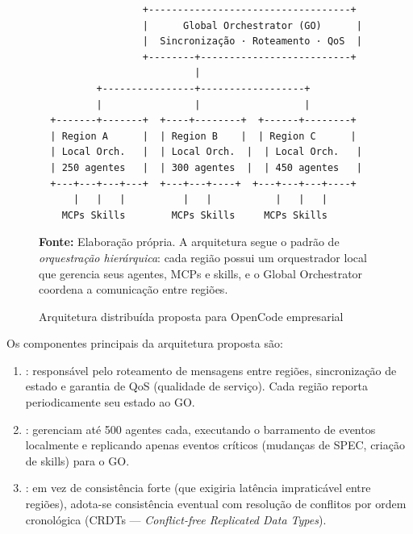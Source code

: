 \begin{figure}[htb]
\centering
\caption{Arquitetura distribuída proposta para OpenCode empresarial}
\label{fig:arquitetura-distribuida}
\begin{verbatim}
                  +-----------------------------------+
                  |      Global Orchestrator (GO)      |
                  |  Sincronização · Roteamento · QoS  |
                  +--------+--------------------------+
                           |
          +----------------+------------------+
          |                |                  |
  +-------+-------+  +----+--------+  +------+--------+
  | Region A      |  | Region B    |  | Region C      |
  | Local Orch.   |  | Local Orch.  |  | Local Orch.   |
  | 250 agentes   |  | 300 agentes  |  | 450 agentes   |
  +---+---+---+---+  +---+---+----+  +---+---+---+----+
      |   |   |          |   |           |   |   |
    MCPs Skills        MCPs Skills     MCPs Skills
\end{verbatim}
\vspace{0.3cm}
\noindent \textbf{Fonte:} Elaboração própria. A arquitetura segue o
padrão de \textit{orquestração hierárquica}: cada região possui um
orquestrador local que gerencia seus agentes, MCPs e skills, e o
Global Orchestrator coordena a comunicação entre regiões.
\end{figure}

Os componentes principais da arquitetura proposta são:

\begin{enumerate}
    \item {}: responsável pelo
    roteamento de mensagens entre regiões, sincronização de estado
    e garantia de QoS (qualidade de serviço). Cada região reporta
    periodicamente seu estado ao GO.

    \item {}: gerenciam até
    500 agentes cada, executando o barramento de eventos localmente
    e replicando apenas eventos críticos (mudanças de SPEC, criação
    de skills) para o GO.

    \item {}: em vez de
    consistência forte (que exigiria latência impraticável entre
    regiões), adota-se consistência eventual com resolução de
    conflitos por ordem cronológica (CRDTs --- \textit{Conflict-free
    Replicated Data Types}).
\end{enumerate}

